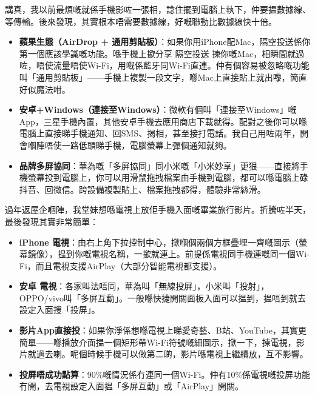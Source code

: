 


講真，我以前最煩嘅就係手機影咗一張相，諗住擺到電腦上執下，仲要揾數據線、等傳輸。後來發現，其實根本唔需要數據線，好嘅聯動比數據線快十倍。

\begin{itemize}
  \item \textbf{蘋果生態（AirDrop + 通用剪貼板）}：如果你用iPhone配Mac，隔空投送係你第一個應該學識嘅功能。喺手機上撳分享 隔空投送 揀你嘅Mac，相瞬間就過咗，唔使流量唔使Wi-Fi，用嘅係藍牙同Wi-Fi直連。仲有個容易被忽略嘅功能叫「通用剪貼板」——手機上複製一段文字，喺Mac上直接貼上就出嚟，簡直好似魔法咁。
  \item \textbf{安卓+Windows（連接至Windows）}：微軟有個叫「連接至Windows」嘅App，三星手機內置，其他安卓手機去應用商店下載就得。配對之後你可以喺電腦上直接睇手機通知、回SMS、揭相，甚至接打電話。我自己用咗兩年，開會嗰陣唔使一路低頭睇手機，電腦螢幕上彈個通知就夠。
  \item \textbf{品牌多屏協同}：華為嘅「多屏協同」同小米嘅「小米妙享」更狠——直接將手機螢幕投到電腦上，你可以用滑鼠拖拽檔案由手機到電腦，都可以喺電腦上碌抖音、回微信。跨設備複製貼上、檔案拖拽都得，體驗非常絲滑。
\end{itemize}


過年返屋企嗰陣，我堂妹想喺電視上放佢手機入面嘅畢業旅行影片。折騰咗半天，最後發現其實非常簡單：

\begin{itemize}
  \item \textbf{iPhone 電視}：由右上角下拉控制中心，撳嗰個兩個方框疊埋一齊嘅圖示（螢幕鏡像），揾到你嘅電視名稱，一撳就連上。前提係電視同手機連嘅同一個Wi-Fi，而且電視支援AirPlay（大部分智能電視都支援）。
  \item \textbf{安卓 電視}：各家叫法唔同，華為叫「無線投屏」，小米叫「投射」，OPPO/vivo叫「多屏互動」。一般喺快捷開關面板入面可以揾到，揾唔到就去設定入面搜「投屏」。
  \item \textbf{影片App直接投}：如果你淨係想喺電視上睇愛奇藝、B站、YouTube，其實更簡單——喺播放介面揾一個矩形帶Wi-Fi符號嘅細圖示，撳一下，揀電視，影片就過去喇。呢個時候手機可以做第二啲，影片喺電視上繼續放，互不影響。
  \item \textbf{投屏唔成功點算}：90\%嘅情況係冇連同一個Wi-Fi。仲有10\%係電視嘅投屏功能冇開，去電視設定入面揾「多屏互動」或「AirPlay」開關。
\end{itemize}

